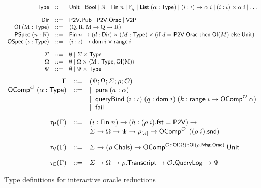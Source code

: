 \begin{figure}[t]
    \[\begin{array}{rcl}
        \mathsf{Type} &::=& \mathsf{Unit} \mid \mathsf{Bool} \mid \mathbb{N} \mid \mathsf{Fin}\; n \mid \mathbb{F}_q \mid \mathsf{List}\;(\alpha : \mathsf{Type}) \mid (i : \iota) \to \alpha\; i \mid (i : \iota) \times \alpha\; i \mid \dots \\[1em]
        \mathsf{Dir} &::=& \mathsf{P2V.Pub} \mid \mathsf{P2V.Orac} \mid \mathsf{V2P} \\ 
        \mathsf{OI}\; (\mathrm{M} : \mathsf{Type}) &::=& \langle \mathrm{Q}, \mathrm{R}, \mathrm{M} \to \mathrm{Q} \to \mathrm{R} \rangle \\
        \mathsf{PSpec}\; (n : \mathbb{N}) &::=& \mathsf{Fin}\; n \to (d : \mathsf{Dir}) \times (M : \mathsf{Type}) \times (\mathsf{if}\; d = \mathsf{P2V.Orac} \; \mathsf{then} \; \mathsf{OI}(M) \; \mathsf{else} \; \mathsf{Unit}) \\
        \mathsf{OSpec} \; (\iota : \mathsf{Type}) &::=& (i : \iota) \to \mathsf{dom}\; i \times \mathsf{range}\; i \\[1em]
        \varSigma &::=& \emptyset \mid \varSigma \times \mathsf{Type} \\
        \Omega &::=& \emptyset \mid \Omega \times \langle \mathrm{M} : \mathsf{Type}, \mathsf{OI}(\mathrm{M}) \rangle \\
        \Psi &::=& \emptyset \mid \Psi \times \mathsf{Type}\\
    \end{array}\]
    \[\begin{array}{rcl}
        \Gamma &::=& (\Psi; \Omega; \varSigma; \rho; \mathcal{O})\\
        \mathsf{OComp}^{\mathcal{O}}\; (\alpha : \mathsf{Type}) &::=& \mid\; \mathsf{pure}\; (a : \alpha) \\
        && \mid\; \mathsf{queryBind}\;(i : \iota)\; (q : \mathsf{dom}\; i)\; (k : \mathsf{range}\; i \to \mathsf{OComp}^{\mathcal{O}}\; \alpha) \\
        && \mid\; \mathsf{fail} \\[1em]
        \tau_{\mathsf{P}}(\Gamma) &::=& (i : \mathsf{Fin}\; n) \to (h : (\rho \; i).\mathsf{fst} = \mathsf{P2V}) \to \\
        && \varSigma \to \Omega \to \Psi \to \rho_{[:i]} \to \mathsf{OComp}^{\mathcal{O}}\;\left( (\rho \; i).\mathsf{snd}\right) \\[1em]

        \tau_{\mathsf{V}}(\Gamma) &::=& \varSigma \to (\rho.\mathsf{Chals}) \to \mathsf{OComp}^{\mathcal{O} :: \mathsf{OI}(\Omega) :: \mathsf{OI}(\rho.\mathsf{Msg.Orac})}\; \mathsf{Unit} \\[1em]
        \tau_{\mathsf{E}}(\Gamma) &::=& \varSigma \to \Omega \to \rho.\mathsf{Transcript} \to \mathcal{O}.\mathsf{QueryLog} \to \Psi
    \end{array}\]
    \caption{Type definitions for interactive oracle reductions}
    \label{fig:type-defs}
\end{figure}

